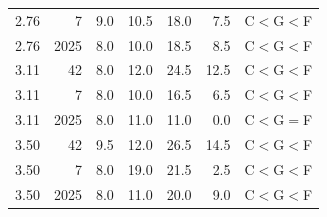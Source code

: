 \documentclass[12pt,openany,a4paper]{book}
\begin{document}
\begin{table}[htbp]
\begin{tabular}{lrrrrrl}
2.76 & 7    & 9.0  & 10.5 & 18.0 & 7.5   & C$<$G$<$F \\
2.76 & 2025 & 8.0  & 10.0 & 18.5 & 8.5   & C$<$G$<$F \\
3.11 & 42   & 8.0  & 12.0 & 24.5 & 12.5  & C$<$G$<$F \\
3.11 & 7    & 8.0  & 10.0 & 16.5 & 6.5   & C$<$G$<$F \\
3.11 & 2025 & 8.0  & 11.0 & 11.0 & 0.0   & C$<$G$=$F \\
3.50 & 42   & 9.5  & 12.0 & 26.5 & 14.5  & C$<$G$<$F \\
3.50 & 7    & 8.0  & 19.0 & 21.5 & 2.5   & C$<$G$<$F \\
3.50 & 2025 & 8.0  & 11.0 & 20.0 & 9.0   & C$<$G$<$F \\
\bottomrule
\end{tabular}
\end{table}
\end{document}
